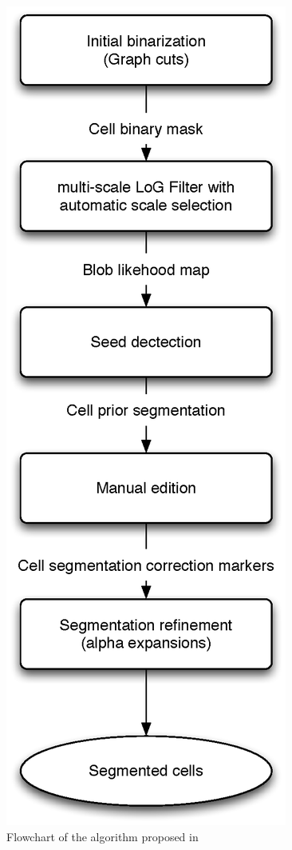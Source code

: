 \begin{figure}[h]
\begin{center}
\leavevmode
\includegraphics[height=0.87\textheight]{pictures/farsightFlowchart}
\end{center}
\caption{Flowchart of the algorithm proposed in~\cite{al2009improved}}
\label{fig:farsightFlowchart}
\end{figure}
